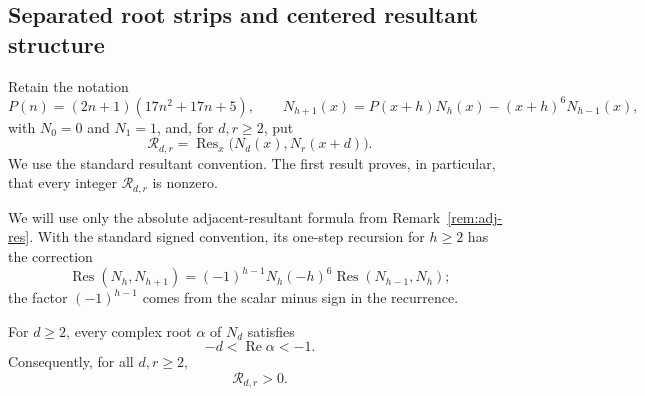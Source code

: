 
\subsection{Separated root strips and centered resultant structure}

Retain the notation
\[
 P(n)=(2n+1)(17n^2+17n+5),\qquad
 N_{h+1}(x)=P(x+h)N_h(x)-(x+h)^6N_{h-1}(x),
\]
with $N_0=0$ and $N_1=1$, and, for $d,r\geq2$, put
\[
 \mathcal R_{d,r}
 =\operatorname {Res}_x\bigl(N_d(x),N_r(x+d)\bigr).
\]
We use the standard resultant convention.  The first result proves, in
particular, that every integer $\mathcal R_{d,r}$ is nonzero.

We will use only the absolute adjacent-resultant formula from
Remark~\ref{rem:adj-res}.  With the standard signed convention, its
one-step recursion for $h\geq2$ has the correction
\[
 \operatorname {Res}(N_h,N_{h+1})
 =(-1)^{h-1}N_h(-h)^6\operatorname {Res}(N_{h-1},N_h);
\]
the factor $(-1)^{h-1}$ comes from the scalar minus sign in the recurrence.

\begin{proposition}\label{prop:meso-root-strip}
For $d\geq2$, every complex root $\alpha$ of $N_d$ satisfies
\begin{equation}\label{eq:meso-root-strip}
 -d<\operatorname {Re}\alpha<-1.
\end{equation}
Consequently, for all $d,r\geq2$,
\[
 \mathcal R_{d,r}>0.
\]
\end{proposition}

